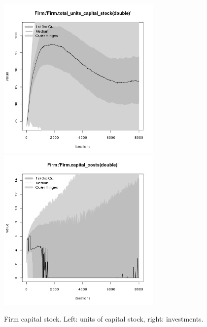 \begin{figure}[H!]
\centering\leavevmode
\begin{minipage}{17cm}
\centering\leavevmode
\includegraphics[width=8cm]{./benchmark_plots/Firm-total_units_capital_stock.png}
\includegraphics[width=8cm]{./benchmark_plots/Firm-capital_costs.png}
\end{minipage}
\caption{Firm capital stock. Left: units of capital stock, right: investments.}
\label{Figure: Firm capital stock}
\end{figure}

